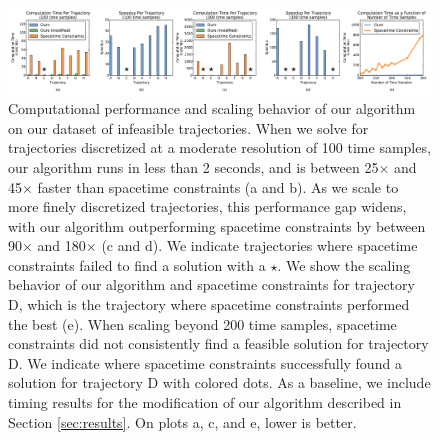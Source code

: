 \begin{figure}[th!]
\centering
\includegraphics[width=7.0in]{images/2016_siggraph/00_computational_performance.pdf}
\caption{
Computational performance and scaling behavior of our algorithm on our dataset of infeasible trajectories.
When we solve for trajectories discretized at a moderate resolution of 100 time samples, our algorithm runs in less than 2 seconds, and is between 25$\times$ and 45$\times$ faster than spacetime constraints (a and b).
As we scale to more finely discretized trajectories, this performance gap widens, with our algorithm outperforming spacetime constraints by between 90$\times$ and 180$\times$ (c and d).
We indicate trajectories where spacetime constraints failed to find a solution with a $\star$.
We show the scaling behavior of our algorithm and spacetime constraints for trajectory \textsc{D}, which is the trajectory where spacetime constraints performed the best (e).
When scaling beyond 200 time samples, spacetime constraints did not consistently find a feasible solution for trajectory \textsc{D}.
We indicate where spacetime constraints successfully found a solution for trajectory \textsc{D} with colored dots.
As a baseline, we include timing results for the modification of our algorithm described in Section \ref{sec:results}.
On plots a, c, and e, lower is better.
}
\label{fig:computation}
\end{figure}

